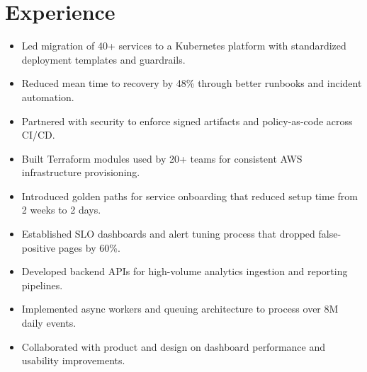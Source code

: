 \section{Experience}

\begin{itemize}
  \item Led migration of 40+ services to a Kubernetes platform with standardized deployment templates and guardrails.
  \item Reduced mean time to recovery by 48\% through better runbooks and incident automation.
  \item Partnered with security to enforce signed artifacts and policy-as-code across CI/CD.
\end{itemize}

\vspace{5pt}
\begin{itemize}
  \item Built Terraform modules used by 20+ teams for consistent AWS infrastructure provisioning.
  \item Introduced golden paths for service onboarding that reduced setup time from 2 weeks to 2 days.
  \item Established SLO dashboards and alert tuning process that dropped false-positive pages by 60\%.
\end{itemize}

\vspace{5pt}
\begin{itemize}
  \item Developed backend APIs for high-volume analytics ingestion and reporting pipelines.
  \item Implemented async workers and queuing architecture to process over 8M daily events.
  \item Collaborated with product and design on dashboard performance and usability improvements.
\end{itemize}

